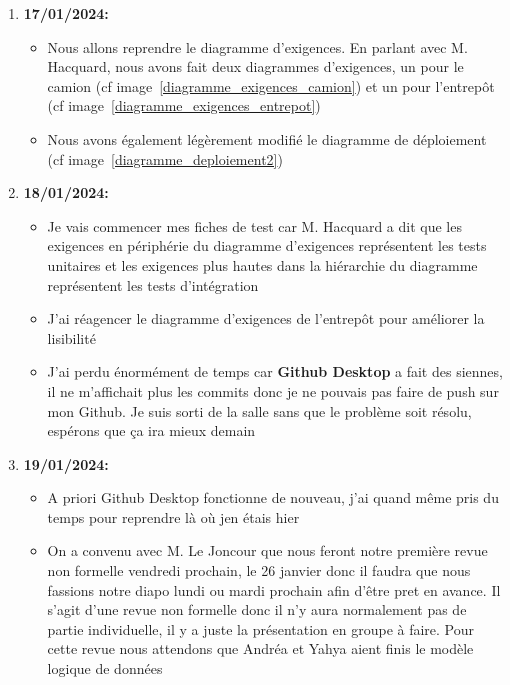 \documentclass[10pt,a4paper]{article}
\begin{document}
\begin{enumerate}
\begin{itemize}
        \end{itemize}
    \item \textbf{17/01/2024:}
        \begin{itemize}
            \item Nous allons reprendre le diagramme d'exigences. En parlant avec M. Hacquard, nous avons fait deux diagrammes d'exigences, un pour le camion (cf image~\ref{diagramme_exigences_camion}) et un pour l'entrepôt (cf image~\ref{diagramme_exigences_entrepot})
            \item Nous avons également légèrement modifié le diagramme de déploiement (cf image~\ref{diagramme_deploiement2})
        \end{itemize}
    
    \newpage
    
    \item \textbf{18/01/2024:}
        \begin{itemize}
            \item Je vais commencer mes fiches de test car M. Hacquard a dit que les exigences en périphérie du diagramme d'exigences représentent les tests unitaires et les exigences plus hautes dans la hiérarchie du diagramme représentent les tests d'intégration
            \item J'ai réagencer le diagramme d'exigences de l'entrepôt pour améliorer la lisibilité
            \item J'ai perdu énormément de temps car \textbf{Github Desktop} a fait des siennes, il ne m'affichait plus les commits donc je ne pouvais pas faire de push sur mon Github. Je suis sorti de la salle sans que le problème soit résolu, espérons que ça ira mieux demain
        \end{itemize}
    \item \textbf{19/01/2024:}
        \begin{itemize}
            \item A priori Github Desktop fonctionne de nouveau, j'ai quand même pris du temps pour reprendre là où jen étais hier
            \item On a convenu avec M. Le Joncour que nous feront notre première revue non formelle vendredi prochain, le 26 janvier donc il faudra que nous fassions notre diapo lundi ou mardi prochain afin d'être pret en avance. Il s'agit d'une revue non formelle donc il n'y aura normalement pas de partie individuelle, il y a juste la présentation en groupe à faire. Pour cette revue nous attendons que Andréa et Yahya aient finis le modèle logique de données

\end{itemize}
\end{enumerate}
\end{document}
